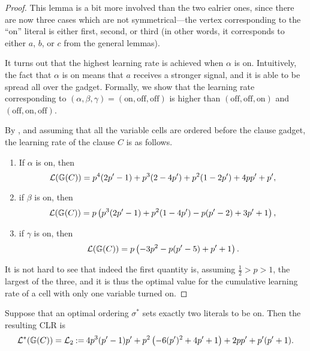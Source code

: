 \begin{proof}
    This lemma is a bit more involved than the two ealrier ones, since there are now three cases which are not symmetrical---the vertex corresponding to the ``on'' literal is either first, second, or third (in other words, it corresponds to either $ a $, $ b $, or $ c $ from the general lemmas).

    It turns out that the highest learning rate is achieved when $ \alpha $ is on.
    Intuitively, the fact that $ \alpha $ is on means that $ a $ receives a stronger signal, and it is able to be spread all over the gadget.
    Formally, we show that the learning rate corresponding to $ \left( \alpha, \beta,\gamma \right) = \left( \text{on},\text{off},\text{off} \right) $ is higher than $ \left( \text{off},\text{off},\text{on} \right) $ and $ \left( \text{off},\text{on},\text{off} \right) $.

    By , and assuming that all the variable cells are ordered before the clause gadget, the learning rate of the clause $ C $ is as follows.
    \begin{enumerate}[ ]
        \item If $ \alpha $ is on, then \[
             \mathcal{L}(\mathbb{G}\!\left(C\right)) = p^4 (2 p'-1)+p^3 (2-4 p')+p^2 (1-2 p')+4 p p'+p',
        \]
        \item if $ \beta $ is on, then \[
            \mathcal{L}(\mathbb{G}\!\left(C\right)) = p \left(p^3 (2 p'-1)+p^2 (1-4 p')-p (p'-2)+3 p'+1\right),
        \]
        \item if $ \gamma $ is on, then \[
            \mathcal{L}(\mathbb{G}\!\left(C\right)) = p \left(-3 p^2-p (p'-5)+p'+1\right).
        \]
    \end{enumerate}
    It is not hard to see that indeed the first quantity is, assuming $ \frac 12 > p > 1 $, the largest of the three, and it is thus the optimal value for the cumulative learning rate of a cell with only one variable turned on.
\end{proof}

\begin{lemma}
    \label{lemma:bayesian_110CLR}
    Suppose that an optimal ordering $\sigma^*$ sets exactly two literals to be on. Then the resulting CLR is \[
        \mathcal{L}^*(\mathbb{G}\!\left(C\right)) =\mathcal{L}_2 \mathbin{:=} 4 p^3 (p'-1) p'+p^2 \left(-6 (p')^2+4 p'+1\right)+2 p p'+p' (p'+1).
     \]
\end{lemma}


